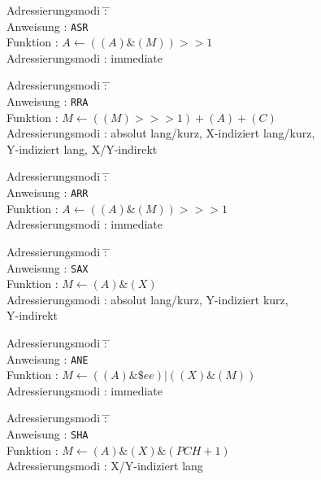 \documentclass[12pt,a4paper,twoside]{report}
\newcommand{\tty}[1]{{\tt #1}}
\begin{document}
\begin{tabbing}
Adressierungsmodi \= : \= \kill \\
Anweisung         \> : \> \tty{ASR} \\
Funktion          \> : \> $A\leftarrow((A)\&(M))>>1$ \\
Adressierungsmodi \> : \> immediate \\
\end{tabbing}
\begin{tabbing}
Adressierungsmodi \= : \= \kill \\
Anweisung         \> : \> \tty{RRA} \\
Funktion          \> : \> $M\leftarrow((M)>>>1)+(A)+(C)$ \\
Adressierungsmodi \> : \> absolut lang/kurz, X-indiziert lang/kurz, \\
                  \>   \> Y-indiziert lang, X/Y-indirekt \\
\end{tabbing}
\begin{tabbing}
Adressierungsmodi \= : \= \kill \\
Anweisung         \> : \> \tty{ARR} \\
Funktion          \> : \> $A\leftarrow((A)\&(M))>>>1$ \\
Adressierungsmodi \> : \> immediate \\
\end{tabbing}
\begin{tabbing}
Adressierungsmodi \= : \= \kill \\
Anweisung         \> : \> \tty{SAX} \\
Funktion          \> : \> $M\leftarrow(A)\&(X)$ \\
Adressierungsmodi \> : \> absolut lang/kurz, Y-indiziert kurz, \\
                  \>   \> Y-indirekt \\
\end{tabbing}
\begin{tabbing}
Adressierungsmodi \= : \= \kill \\
Anweisung         \> : \> \tty{ANE} \\
Funktion          \> : \> $M\leftarrow((A)\&\$ee)|((X)\&(M))$ \\
Adressierungsmodi \> : \> immediate \\
\end{tabbing}
\begin{tabbing}
Adressierungsmodi \= : \= \kill \\
Anweisung         \> : \> \tty{SHA} \\
Funktion          \> : \> $M\leftarrow(A)\&(X)\&(PCH+1)$ \\
Adressierungsmodi \> : \> X/Y-indiziert lang \\
\end{tabbing}
\end{document}
